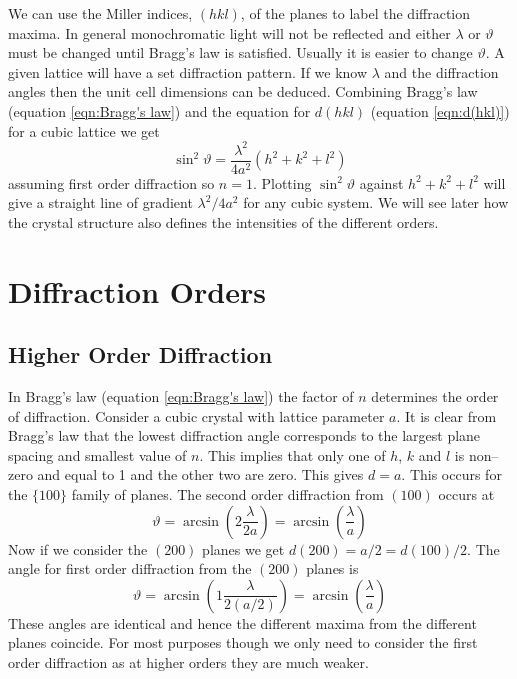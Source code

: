     We can use the Miller indices, \((hkl)\), of the planes to label the diffraction maxima.
    In general monochromatic light will not be reflected and either \(\lambda\) or \(\vartheta\) must be changed until Bragg's law is satisfied.
    Usually it is easier to change \(\vartheta\).
    A given lattice will have a set diffraction pattern.
    If we know \(\lambda\) and the diffraction angles then the unit cell dimensions can be deduced.
    Combining Bragg's law (equation \ref{eqn:Bragg's law}) and the equation for \(d(hkl)\) (equation \ref{eqn:d(hkl)}) for a cubic lattice we get
    \[\sin^2\vartheta = \frac{\lambda^2}{4a^2}(h^2 + k^2 + l^2)\]
    assuming first order diffraction so \(n = 1\).
    Plotting \(\sin^2\vartheta\) against \(h^2 + k^2 + l^2\) will give a straight line of gradient \(\lambda^2/4a^2\) for any cubic system.
    We will see later how the crystal structure also defines the intensities of the different orders.
    
    \section{Diffraction Orders}
    \subsection{Higher Order Diffraction}
    In Bragg's law (equation \ref{eqn:Bragg's law}) the factor of \(n\) determines the order of diffraction.
    Consider a cubic crystal with lattice parameter \(a\).
    It is clear from Bragg's law that the lowest diffraction angle corresponds to the largest plane spacing and smallest value of \(n\).
    This implies that only one of \(h\), \(k\) and \(l\) is non--zero and equal to 1 and the other two are zero.
    This gives \(d = a\).
    This occurs for the \(\{100\}\) family of planes.
    The second order diffraction from \((100)\) occurs at
    \[\vartheta = \arcsin\left(2\frac{\lambda}{2a}\right) = \arcsin\left(\frac{\lambda}{a}\right)\]
    Now if we consider the \((200)\) planes we get \(d(200) = a/2= d(100)/2\).
    The angle for first order diffraction from the \((200)\) planes is
    \[\vartheta = \arcsin\left(1\frac{\lambda}{2(a/2)}\right) = \arcsin\left(\frac{\lambda}{a}\right)\]
    These angles are identical and hence the different maxima from the different planes coincide.
    For most purposes though  we only need to consider the first order diffraction as at higher orders they are much weaker.
    
